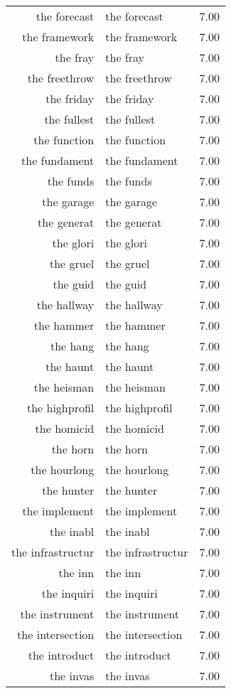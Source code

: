 \begin{table}[ht]
\begin{tabular}{rlr}
  the forecast & the forecast & 7.00 \\ 
  the framework & the framework & 7.00 \\ 
  the fray & the fray & 7.00 \\ 
  the freethrow & the freethrow & 7.00 \\ 
  the friday & the friday & 7.00 \\ 
  the fullest & the fullest & 7.00 \\ 
  the function & the function & 7.00 \\ 
  the fundament & the fundament & 7.00 \\ 
  the funds & the funds & 7.00 \\ 
  the garage & the garage & 7.00 \\ 
  the generat & the generat & 7.00 \\ 
  the glori & the glori & 7.00 \\ 
  the gruel & the gruel & 7.00 \\ 
  the guid & the guid & 7.00 \\ 
  the hallway & the hallway & 7.00 \\ 
  the hammer & the hammer & 7.00 \\ 
  the hang & the hang & 7.00 \\ 
  the haunt & the haunt & 7.00 \\ 
  the heisman & the heisman & 7.00 \\ 
  the highprofil & the highprofil & 7.00 \\ 
  the homicid & the homicid & 7.00 \\ 
  the horn & the horn & 7.00 \\ 
  the hourlong & the hourlong & 7.00 \\ 
  the hunter & the hunter & 7.00 \\ 
  the implement & the implement & 7.00 \\ 
  the inabl & the inabl & 7.00 \\ 
  the infrastructur & the infrastructur & 7.00 \\ 
  the inn & the inn & 7.00 \\ 
  the inquiri & the inquiri & 7.00 \\ 
  the instrument & the instrument & 7.00 \\ 
  the intersection & the intersection & 7.00 \\ 
  the introduct & the introduct & 7.00 \\ 
  the invas & the invas & 7.00 \\ 

\end{tabular}
\end{table}
